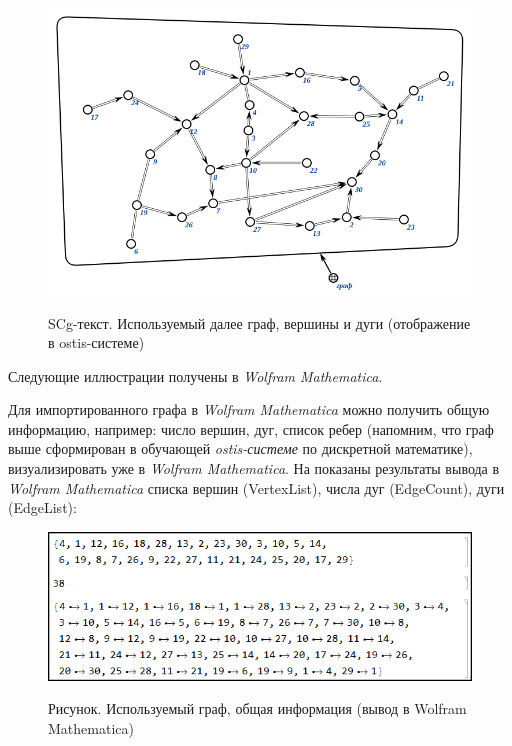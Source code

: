 \begin{figure}[H]
	\caption{SCg-текст. Используемый далее граф, вершины и дуги (отображение в  ostis-системе)}
	\includegraphics[scale=0.9]{images/part7/chapter_integration/integr_alg31a.png}
	\label{fig:integr_alg31}
\end{figure}

Следующие иллюстрации получены в \textit{Wolfram Mathematica}. 

Для импортированного графа в \textit{Wolfram Mathematica} можно получить общую информацию, например: число вершин, дуг, список ребер (напомним, что граф выше сформирован в обучающей \textit{ostis-системе} по дискретной математике), визуализировать уже в \textit{Wolfram Mathematica}. На \textit{}
показаны результаты вывода в \textit{Wolfram Mathematica} списка вершин (VertexList), числа дуг (EdgeCount), дуги (EdgeList):
\begin{figure}[H]
	\caption{Рисунок. Используемый граф, общая информация (вывод в Wolfram Mathematica)}
	\includegraphics[scale=0.65]{images/part7/chapter_integration/integr_alg31d.png}
	\label{fig:integr_alg31d}
\end{figure}

